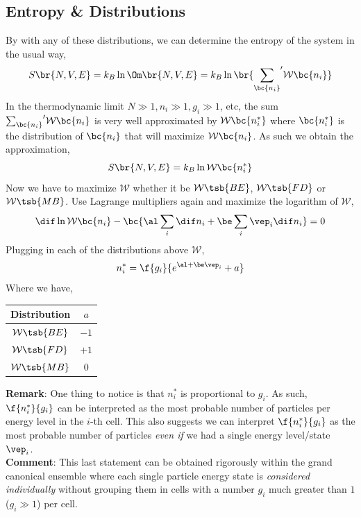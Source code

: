 \documentclass{article}
\begin{document}
{\subsection{Entropy \& Distributions}
\label{sec:a}
By with any of these distributions, we can determine the entropy of the system in the usual way,
\[ S \br{N, V, E} = k_B \ln \Om \br{N, V, E} = k_B \ln \br{{\sum_{\bc{n_i}}}' \mathcal{W}\bc{n_i}} \]
In the thermodynamic limit $N \gg 1, n_i \gg 1, g_i \gg 1$, etc, the sum ${\sum_{\bc{n_i}}}' \mathcal{W}\bc{n_i}$ is very well approximated by $\mathcal{W}\bc{n_i^*}$ where $\bc{n_i^*}$ is the distribution of $\bc{n_i}$ that will maximize $\mathcal{W}\bc{n_i}$. As such we obtain the approximation,
\[ S \br{N, V, E} = k_B \ln \mathcal{W} \bc{n_i^*} \]
Now we have to maximize $\mathcal{W}$ whether it be $\mathcal{W}\tsb{BE}$, $\mathcal{W}\tsb{FD}$ or $\mathcal{W}\tsb{MB}$. Use Lagrange multipliers again and maximize the logarithm of $\mathcal{W}$,
\[ \dif \ln \mathcal{W} \bc{n_i} - \bc{\al \sum_i \dif n_i + \be \sum_i \vep_i \dif n_i} = 0 \]
Plugging in each of the distributions above $\mathcal{W}$,
\[ n_i^* = \f{g_i}{e^{\al + \be \vep_i} + a} \]
Where we have,
\begin{center}
    \begin{tabular}{|c|c|}
        \hline
        Distribution & $a$ \\
        \hline
        $\mathcal{W}\tsb{BE}$ & $-1$ \\
        $\mathcal{W}\tsb{FD}$ & $+1$ \\
        $\mathcal{W}\tsb{MB}$ & $0$ \\
        \hline
    \end{tabular}
\end{center}

\textbf{Remark}: One thing to notice is that $n_i^*$ is proportional to $g_i$. As such, $\f{n_i^*}{g_i}$ can be interpreted as the most probable number of particles per energy level in the $i$-th cell. This also suggests we can interpret $\f{n_i^*}{g_i}$ as the most probable number of particles \textit{even if} we had a single energy level/state $\vep_i$. \\

\textbf{Comment}: This last statement can be obtained rigorously within the grand canonical ensemble where each single particle energy state is \textit{considered individually} without grouping them in cells with a number $g_i$ much greater than $1$ ($g_i \gg 1$) per cell. \\

}
\end{document}
